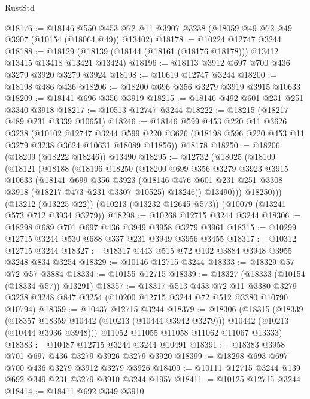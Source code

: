\begin{lexlean}{RustStd}
\begin{coremodule}
@18176 := @18146
    @550
    @453
    @72
    @11
    @3907
    @3238
    (@18059 @49 @72 @49 @3907 (@10154 (@18064 @49)) @13402)
@18178 := @10224 @12747 @3244
@18188 := @18129 (@18139 (@18144 (@18161 (@18176 @18178))) @13412 @13415 @13418 @13421 @13424)
@18196 := @18113 @3912 @697 @700 @436 @3279 @3920 @3279 @3924
@18198 := @10619 @12747 @3244
@18200 := @18198 @486 @436
@18206 := @18200 @696 @356 @3279 @3919 @3915 @10633
@18209 := @18141 @696 @356 @3919
@18215 := @18146 @492 @601 @231 @251 @3340 @3918
@18217 := @10513 @12747 @3244
@18222 := @18215 (@18217 @489 @231 @3339 @10651)
@18246 := @18146
    @599
    @453
    @220
    @11
    @3626
    @3238
    (@10102
      @12747
      @3244
      @599
      @220
      @3626
      (@18198 @596 @220 @453 @11 @3279 @3238 @3624 @10631 @18089 @11856))
    @18178
@18250 := @18206 (@18209 (@18222 @18246)) @13490
@18295 := @12732
    (@18025
      (@18109
        (@18121
          (@18188
            (@18196
              @18250
              (@18200
                @699
                @356
                @3279
                @3923
                @3915
                @10633
                (@18141
                  @699
                  @356
                  @3923
                  (@18146 @476 @601 @231 @251 @3308 @3918 (@18217 @473 @231 @3307 @10525) @18246))
                @13490)))
          @18250)))
    (@13212 (@13225 @22))
    (@10213 (@13232 @12645 @573))
    (@10079 (@13241 @573 @712 @3934 @3279))
@18298 := @10268 @12715 @3244 @3244
@18306 := @18298 @689 @701 @697 @436 @3949 @3958 @3279 @3961
@18315 := @10299 @12715 @3244 @530 @688 @337 @231 @3949 @3956 @3455
@18317 := @10312 @12715 @3244
@18327 := @18317 @443 @515 @72 @102 @3884 @3948 @3955 @3248 @834 @3254
@18329 := @10146 @12715 @3244
@18333 := @18329 @57 @72 @57 @3884
@18334 := @10155 @12715
@18339 := @18327 (@18333 (@10154 (@18334 @57)) @13291)
@18357 := @18317
    @513
    @453
    @72
    @11
    @3380
    @3279
    @3238
    @3248
    @847
    @3254
    (@10200 @12715 @3244 @72 @512 @3380 @10790 @10794)
@18359 := @10437 @12715 @3244
@18379 := @18306
    (@18315
      (@18339
        (@18357 @18359 @10442 (@10213 (@10444 @3942 @3279)))
        @10442
        (@10213 (@10444 @3936 @3948)))
      @11052
      @11055
      @11058
      @11062
      @11067
      @13333)
@18383 := @10487 @12715 @3244 @3244 @10491
@18391 := @18383 @3958 @701 @697 @436 @3279 @3926 @3279 @3920
@18399 := @18298 @693 @697 @700 @436 @3279 @3912 @3279 @3926
@18409 := @10111 @12715 @3244 @139 @692 @349 @231 @3279 @3910 @3244 @1957
@18411 := @10125 @12715 @3244
@18414 := @18411 @692 @349 @3910

\end{coremodule}
\end{lexlean}
